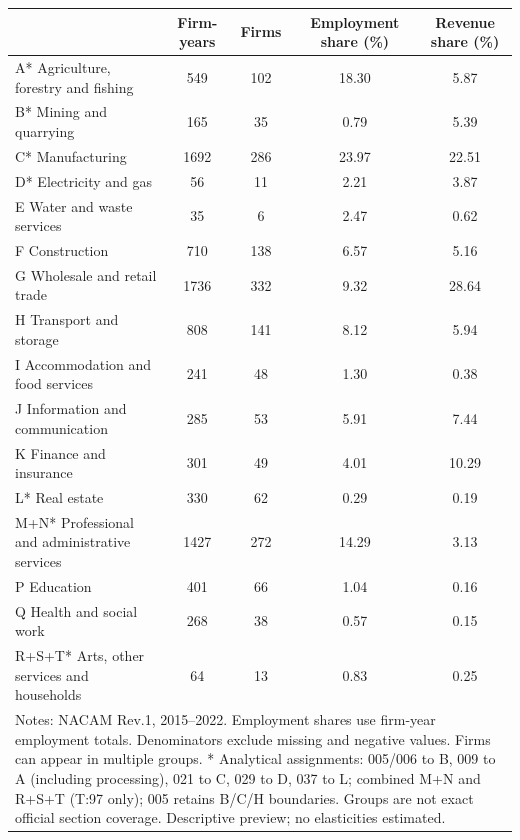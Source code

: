 \begin{tabular}{l*{4}{c}}
\toprule
            &  Firm-years&       Firms&Employment share (\%)&Revenue share (\%)\\
\midrule
A*  Agriculture, forestry and fishing&         549&         102&       18.30&        5.87\\
B*  Mining and quarrying&         165&          35&        0.79&        5.39\\
C*  Manufacturing&        1692&         286&       23.97&       22.51\\
D*  Electricity and gas&          56&          11&        2.21&        3.87\\
E  Water and waste services&          35&           6&        2.47&        0.62\\
F  Construction&         710&         138&        6.57&        5.16\\
G  Wholesale and retail trade&        1736&         332&        9.32&       28.64\\
H  Transport and storage&         808&         141&        8.12&        5.94\\
I  Accommodation and food services&         241&          48&        1.30&        0.38\\
J  Information and communication&         285&          53&        5.91&        7.44\\
K  Finance and insurance&         301&          49&        4.01&       10.29\\
L*  Real estate&         330&          62&        0.29&        0.19\\
M+N*  Professional and administrative services&        1427&         272&       14.29&        3.13\\
P  Education&         401&          66&        1.04&        0.16\\
Q  Health and social work&         268&          38&        0.57&        0.15\\
R+S+T*  Arts, other services and households&          64&          13&        0.83&        0.25\\
\bottomrule
\multicolumn{5}{p{0.95\linewidth}}{\footnotesize Notes: NACAM Rev.1, 2015--2022. Employment shares use firm-year employment totals. Denominators exclude missing and negative values. Firms can appear in multiple groups. * Analytical assignments: 005/006 to B, 009 to A (including processing), 021 to C, 029 to D, 037 to L; combined M+N and R+S+T (T:97 only); 005 retains B/C/H boundaries. Groups are not exact official section coverage. Descriptive preview; no elasticities estimated.}
\end{tabular}

